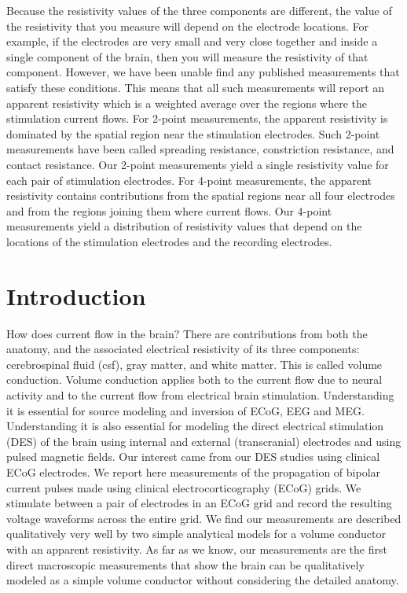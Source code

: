 Because the resistivity values of the three components are different, the value of the resistivity that you measure will depend on the electrode locations. For example, if the electrodes are very small and very close together and inside a single component of the brain, then you will measure the resistivity of that component. However, we have been unable find any published measurements that satisfy these conditions. This means that all such measurements will report an apparent resistivity which is a weighted average over the regions where the stimulation current flows. For 2-point measurements, the apparent resistivity is dominated by the spatial region near the stimulation electrodes. Such 2-point measurements have been called spreading resistance, constriction resistance, and contact resistance. Our 2-point measurements yield a single resistivity value for each pair of stimulation electrodes. For 4-point measurements, the apparent resistivity contains contributions from the spatial regions near all four electrodes and from the regions joining them where current flows. Our 4-point measurements yield a distribution of resistivity values that depend on the locations of the stimulation electrodes and the recording electrodes.


\section{Introduction}

How does current flow in the brain? There are contributions from both the anatomy, and the associated electrical resistivity of its three components: cerebrospinal fluid (csf), gray matter, and white matter. This is called volume conduction. Volume conduction applies both to the current flow due to neural activity and to the current flow from electrical brain stimulation. Understanding it is essential for source modeling and inversion of ECoG, EEG and MEG. Understanding it is also essential for modeling the direct electrical stimulation (DES) of the brain using internal and external (transcranial) electrodes and using pulsed magnetic fields. Our interest came from our DES studies using clinical ECoG electrodes. We report here measurements of the propagation of bipolar current pulses made using clinical electrocorticography (ECoG) grids. We stimulate between a pair of electrodes in an ECoG grid and record the resulting voltage waveforms across the entire grid. We find our measurements are described qualitatively very well by two simple analytical models for a volume conductor with an apparent resistivity. As far as we know, our measurements are the first direct macroscopic measurements that show the brain can be qualitatively modeled as a simple volume conductor without considering the detailed anatomy. 

